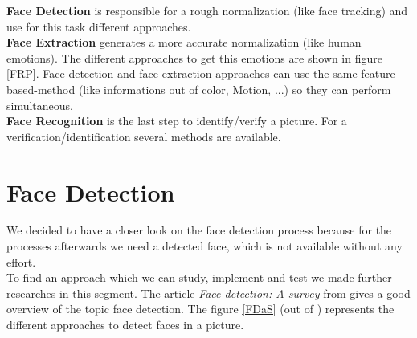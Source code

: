 \documentclass[Bachelorarbeit.tex]{subfiles}
\begin{document}
\textbf{Face Detection} is responsible for a rough normalization (like face tracking) and use for this task different approaches.\\
\textbf{Face Extraction} generates a more accurate normalization (like human emotions). The different approaches to get this emotions are shown in figure \ref{FRP}. Face detection and face extraction approaches can use the same feature-based-method (like informations out of color, Motion, ...) so they can perform simultaneous. \\
\textbf{Face Recognition} is the last step to identify/verify a picture. For a verification/identification several methods are available.


\section{Face Detection}
We decided to have a closer look on the face detection process because for the processes afterwards we need a detected face, which is not available without any effort.
\\To find an approach which we can study, implement and test we made further researches in this segment. The article \textit{Face detection: A survey} from \cite{FDASurvey} gives a good overview of the topic face detection. The figure \ref{FDaS} (out of \cite{FDASurvey}) represents the different approaches to detect faces in a picture.\\
\end{document}
